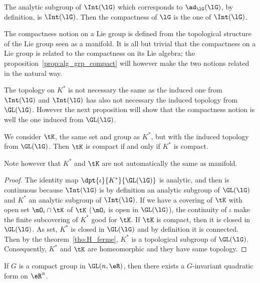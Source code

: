 The analytic subgroup of $\Int(\lG)$ which corresponds to $\ad_{\lG}(\lG)$, by definition, is $\Int(\lG)$. Then the compactness of $\lG$ is the one of $\Int(\lG)$.

\begin{remark}
The compactness notion on a Lie group is defined from the topological structure of the Lie group seen as a manifold. It is all but trivial that the compactness on a Lie group is related to the compactness on its Lie algebra; the proposition~\ref{prop:alg_grp_compact} will however make the two notions related in the natural way.
\end{remark}

\begin{remark}
The topology on $K^*$ is not necessary the same as the induced one from $\Int(\lG)$ and $\Int(\lG)$ has also not necessary the induced topology from $\GL(\lG)$. However the next proposition will show that the compactness notion is well the one induced from $\GL(\lG)$.
\end{remark}

\begin{proposition}
We consider $\tK$, the same set and group as $K^*$, but with the induced topology from $\GL(\lG)$. Then $\tK$ is compact if and only if $K^*$ is compact.
\end{proposition}

Note however that $K^*$ and $\tK$ are not automatically the same as manifold.

\begin{proof}
The identity map $\dpt{\iota}{K^*}{\GL(\lG)}$ is analytic, and then is continuous because $\Int(\lG)$ is by definition an analytic subgroup of $\GL(\lG)$ and $K^*$ an analytic subgroup of $\Int(\lG)$. If we have a covering of $\tK$ with open set $\mO_i\cap\tK$ of $\tK$ ($\mO_i$ is open in $\GL(\lG)$), the continuity of $\iota$ make the finite subcovering of $K^*$ good for $\tK$.
If $\tK$ is compact, then it is closed in $\GL(\lG)$. As set, $K^*$ is closed in $\GL(\lG)$ and by definition it is connected. Then by the theorem~\ref{tho:H_ferme}, $K^*$ is a topological subgroup of $\GL(\lG)$. Consequently, $K^*$ and $\tK$ are homeomorphic and they have same topology.
\end{proof}

\begin{lemma}
    If $G$ is a compact group in $\GL(n,\eR)$, then there exists a $G$-invariant quadratic form on $\eR^n$.
\end{lemma}

